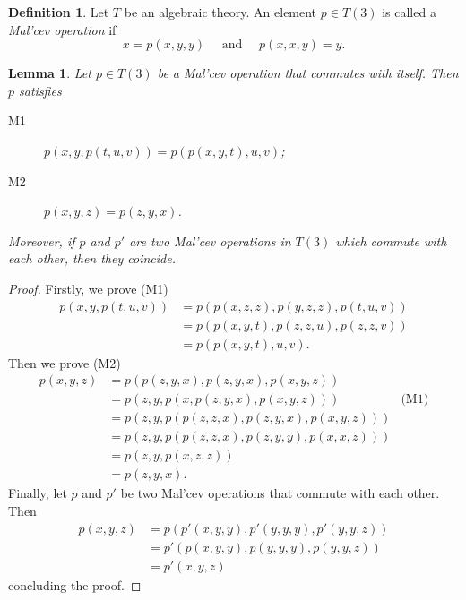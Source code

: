 \documentclass{amsart}
\numberwithin{equation}{section}
\theoremstyle{plain}
\newtheorem{lemma}[theorem]{Lemma}
\theoremstyle{definition}
\newtheorem{definition}[theorem]{Definition}
\begin{document}
\begin{definition} 
  Let $T$ be an algebraic theory. 
  An element $p \in T(3)$ is called a \emph{Mal'cev operation} if 
  \begin{equation*}
    x=p(x,y,y) \quad \text{ and } \quad p(x,x,y)=y \text{.}
  \end{equation*}
\end{definition}


\begin{lemma}
  \label{lem:asscomm}
  Let $p \in T(3)$ be a Mal'cev operation that commutes with itself. 
  Then $p$ satisfies 
    \begin{description}
    \item[M1] $p(x,y,p(t,u,v)) = p(p(x,y,t),u,v)$; 
    \item[M2] $p(x,y,z) = p(z,y,x)$. 
  \end{description}
  Moreover, if $p$ and $p'$ are two Mal'cev operations in $T(3)$ which commute with each other, then they coincide.  
\end{lemma}
\begin{proof}
  Firstly, we prove (M1)  
  \begin{align*}
    p(x,y,p(t,u,v)) & = p(p(x,z,z),p(y,z,z),p(t,u,v)) \\
    & = p(p(x,y,t),p(z,z,u),p(z,z,v)) \\
    & = p(p(x,y,t),u,v)\text{.}
  \end{align*}
  Then we prove (M2)
  \begin{align*}
    p(x,y,z) & = p(p(z,y,x),p(z,y,x),p(x,y,z)) & \\
    & = p(z,y,p(x,p(z,y,x),p(x,y,z))) & \text{(M1)} \\
    & = p(z,y,p(p(z,z,x),p(z,y,x),p(x,y,z))) & \\
    & = p(z,y,p(p(z,z,x),p(z,y,y),p(x,x,z))) &\\
    & = p(z,y,p(x,z,z))& \\
    & = p(z,y,x)\text{.}& 
  \end{align*} 
  Finally, let $p$ and $p'$ be two Mal'cev operations that commute with each other.
  Then 
  \begin{align*}
    p(x,y,z) & = p(p'(x,y,y),p'(y,y,y),p'(y,y,z)) \\
    & = p'(p(x,y,y),p(y,y,y),p(y,y,z)) \\
    & = p'(x,y,z)
  \end{align*}
  concluding the proof. 
\end{proof}
 
\end{document}
